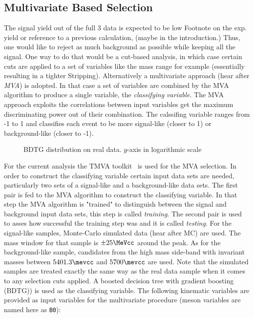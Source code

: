 

\subsection{Multivariate Based Selection}
\label{Multivariate_Based_Selection}

The \BsJpsiKst signal yield out of the full 3 \invfb data is expected to be low {\color{red} Footnote on the exp. yield or reference to a 
previous calculation, (maybe in the introduction.)} Thus, one would like to reject as much background as possible while keeping all the signal. 
One way to do that would be a cut-based analysis, in which case certain cuts are applied to a set of variables like the \Bs 
mass range for example (essentially resulting in a tighter Stripping). Alternatively a multivariate approach (hear after {\it MVA}) is adopted. 
In that case a set of variables are combined by the MVA algorithm to produce a single variable, the {\it classifying variable}. 
The MVA approach exploits the correlations between input variables get the maximum discriminating power out of their combination.
The calssifing variable ranges from -1 to 1 and classifies each event to be more signal-like (closer to 1) or background-like (closer to -1). 

\begin{figure}[h]
\begin{center}
\scalebox{1}{}
\caption{BDTG distribution on real data. $y$-axis in logarithmic scale}
\label{BTDG_performance}
\end{center}
\end{figure}

For the current analysis the TMVA toolkit~\cite{TMVA} is used for the MVA selection. In order to construct the classifying variable certain 
input data sets are needed, particularly two sets of a signal-like and a background-like data sets. The first pair is fed to the MVA algorithm 
to construct the classifying variable. In that step the MVA algorithm is "trained" to distinguish between the signal and background input data sets,
this step is called {\it training}. The second pair is used to asses how successful the training step was and it is called {\it testing}. 
For the signal-like samples, \BsJpsiKst Monte-Carlo simulated data (hear after MC)
are used. The \Bs mass window for that sample is $\pm 25 \MeVcc$ around the \Bs peak. As for the background-like sample, candidates from the high mass side-band
with invariant masses between $5401.3\mevcc$ and $5700\mevcc$ are used. Note that the simulated samples are treated exactly the same way as the
real data sample when it comes to any selection cuts applied. A boosted decision tree with gradient boosting (BDTG){\color{red}{what is gradient boosting})}
is used as the classifying variable. The following kinematic variables are provided as input variables for the multivariate procedure (\Bs meson variables are 
named here as \texttt{B0}):

